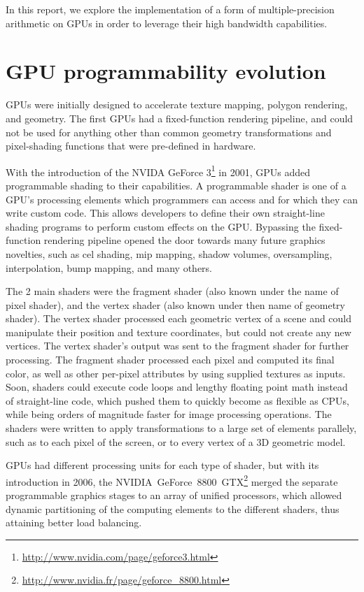 \documentclass[12pt, a4paper]{report}
\begin{document}
In this report, we explore the implementation of a form of multiple-precision
arithmetic on GPUs in order to leverage their high bandwidth capabilities.

\section{GPU programmability evolution}
GPUs were initially designed to accelerate texture mapping, polygon rendering,
and geometry.
The first GPUs had a fixed-function rendering pipeline, and could not be used
for anything other than common geometry transformations and pixel-shading
functions that were pre-defined in hardware.

With the introduction of the NVIDA GeForce
3\footnote{\url{http://www.nvidia.com/page/geforce3.html}} in 2001, GPUs added
programmable shading to their capabilities.
A programmable shader is one of a GPU's processing elements which programmers can access and for which they can write custom code.
This allows developers to define
their own straight-line shading programs to perform custom effects on the GPU.
Bypassing the fixed-function rendering pipeline opened the door towards many
future graphics novelties, such as cel shading, mip mapping, shadow volumes,
oversampling, interpolation, bump mapping, and many others.

The 2 main shaders were the fragment shader (also known under the name of pixel
shader), and the vertex shader (also known under then name of geometry shader).
The vertex shader processed each geometric vertex of a scene and could
manipulate their position and texture coordinates, but could not create any new
vertices.
The vertex shader's output was sent to the fragment shader for further
processing.
The fragment shader processed each pixel and computed its final color, as well
as other per-pixel attributes by using supplied textures as inputs.
Soon, shaders could execute code loops and lengthy floating point math instead
of straight-line code, which pushed them to quickly become as flexible as CPUs,
while being orders of magnitude faster for image processing operations.
The shaders were written to apply transformations to a large set of elements
parallely, such as to each pixel of the screen, or to every vertex of a 3D
geometric model.

GPUs had different processing units for each type of shader, but with its
introduction in 2006, the NVIDIA~GeForce~8800~GTX\footnote{\url{http://www.nvidia.fr/page/geforce_8800.html}} merged the separate
programmable graphics stages to an array of unified processors, which allowed
dynamic partitioning of the computing elements to the different shaders, thus
attaining better load balancing.
\end{document}
